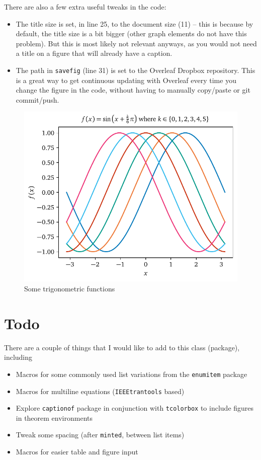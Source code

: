 \documentclass[letterpaper,11pt]{notes}
\theoremstyle{definition}
\theoremstyle{plain}
\theoremstyle{remark}
\begin{document}
There are also a few extra useful tweaks in the code:
\begin{itemize}
    \item The title size is set, in line 25, to the document size (11) -- this is because by default, the title size is a bit bigger (other graph elements do not have this problem). But this is most likely not relevant anyways, as you would not need a title on a figure that will already have a caption.
    \item The path in \texttt{savefig} (line 31) is set to the Overleaf Dropbox repository. This is a great way to get continuous updating with Overleaf every time you change the figure in the code, without having to manually copy/paste or git commit/push.
\end{itemize}

\begin{figure}
    \centering
    \includegraphics{trig.pdf}
    \caption{Some trigonometric functions}
    \label{fig:trig}
\end{figure}

\section{Todo}
There are a couple of things that I would like to add to this class (package), including
\begin{itemize}
    \item Macros for some commonly used list variations from the \texttt{enumitem} package
    \item Macros for multiline equations (\texttt{IEEEtrantools} based)
    \item Explore \texttt{captionof} package in conjunction with \texttt{tcolorbox} to include figures in theorem environments
    \item Tweak some spacing (after \texttt{minted}, between list items)
    \item Macros for easier table and figure input
\end{itemize}
\end{document}
